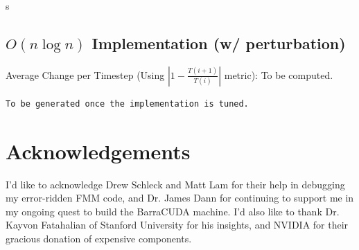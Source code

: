 s\documentclass[10pt]{article}
\begin{document}
\subsection{$O(n \log n)$ Implementation (w/ perturbation)}
Average Change per Timestep (Using $|1 - \frac{T(i+1)}{T(i)}|$ metric): To be computed.
\footnotesize
\begin{verbatim}
To be generated once the implementation is tuned.
\end{verbatim}
\small


\section{Acknowledgements}
I'd like to acknowledge Drew Schleck and Matt Lam for their help in debugging my error-ridden FMM code, and Dr. James Dann for continuing to support me in my ongoing quest to build the BarraCUDA machine.
I'd also like to thank Dr. Kayvon Fatahalian of Stanford University for his insights, and NVIDIA for their gracious donation of expensive components.
\end{document}
